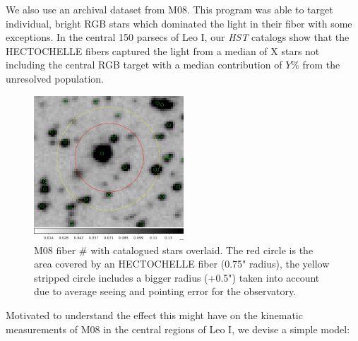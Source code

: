 \documentclass[%
 aip,
 twocolumn,
 jmp,%
 amsmath,amssymb,
 reprint,%
]{aastex61}
\begin{document}
We also use an archival dataset from M08.  This program was able to target
individual, bright RGB stars which dominated the light in their fiber with 
some exceptions.  In the central 150 parsecs of Leo I, our {\it HST} catalogs
show that the HECTOCHELLE fibers captured the light from a median of X stars 
not including the central RGB target with a median contribution of $Y\%$ 
from the unresolved population.


\begin{figure}
\centering
\includegraphics[width=0.5\textwidth]{CROWDING/FIBER_CROWDING.png}
\caption{M08 fiber # with catalogued stars overlaid. The red circle is the area covered by an HECTOCHELLE fiber (0.75" radius), the yellow stripped circle includes a bigger radius (+0.5") taken into account due to average seeing and pointing error for the observatory.}       
\end{figure}


Motivated to understand the effect this
might have on the kinematic measurements of M08 in the central 
regions of Leo I, we devise a simple model:
\end{document}
